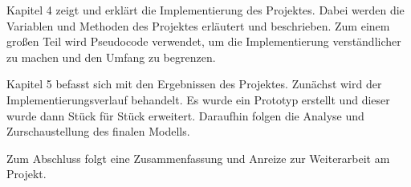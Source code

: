 Kapitel 4 zeigt und erklärt die Implementierung des Projektes. Dabei werden die Variablen und Methoden des Projektes erläutert und beschrieben. Zum einem großen Teil wird Pseudocode verwendet, um die Implementierung verständlicher zu machen und den Umfang zu begrenzen.

Kapitel 5 befasst sich mit den Ergebnissen des Projektes. Zunächst wird der Implementierungsverlauf behandelt. Es wurde ein Prototyp erstellt und dieser wurde dann Stück für Stück erweitert. Daraufhin folgen die Analyse und Zurschaustellung des finalen Modells.

Zum Abschluss folgt eine Zusammenfassung und Anreize zur Weiterarbeit am Projekt.